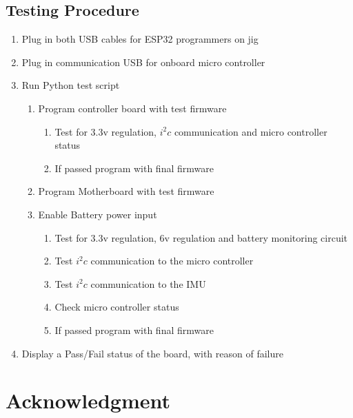 \documentclass[conference]{IEEEtran}
\begin{document}
\begin{appendices}
\section{Testing Procedure}
\label{appendix:TestingProcedure}
\begin{enumerate}
    \item Plug in both USB cables for ESP32 programmers on jig
    \item Plug in communication USB for onboard micro controller
    \item Run Python test script
    \begin{enumerate}
        \item Program controller board with test firmware
        \begin{enumerate}
            \item Test for 3.3v regulation, $i^2c$ communication and micro controller status
            \item If passed program with final firmware
        \end{enumerate}
         \item Program Motherboard with test firmware
         \item Enable Battery power input
        \begin{enumerate}
            \item Test for 3.3v regulation, 6v regulation and battery monitoring circuit
            \item Test $i^2c$ communication to the micro controller
            \item Test $i^2c$ communication to the IMU
            \item Check micro controller status
            \item If passed program with final firmware
        \end{enumerate}
    \end{enumerate}
    \item Display a Pass/Fail status of the board, with reason of failure    
\end{enumerate}
\end{appendices}

\section*{Acknowledgment}



\end{document}
